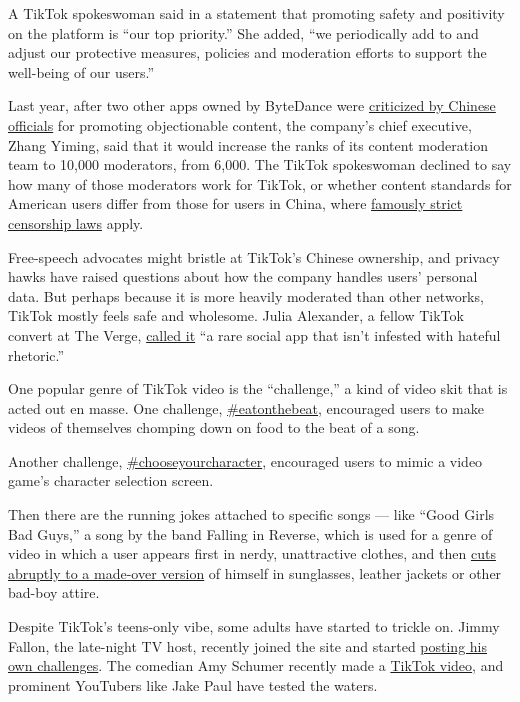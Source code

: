 A TikTok spokeswoman said in a statement that promoting safety and
positivity on the platform is ``our top priority.'' She added, ``we
periodically add to and adjust our protective measures, policies and
moderation efforts to support the well-being of our users.''

Last year, after two other apps owned by ByteDance were
\href{https://www.nytimes.com/2018/10/29/technology/bytedance-app-funding-china.html}{criticized
by Chinese officials} for promoting objectionable content, the company's
chief executive, Zhang Yiming, said that it would increase the ranks of
its content moderation team to 10,000 moderators, from 6,000. The TikTok
spokeswoman declined to say how many of those moderators work for
TikTok, or whether content standards for American users differ from
those for users in China, where
\href{https://www.nytimes.com/2018/01/02/business/china-toutiao-censorship.html}{famously
strict censorship laws} apply.

Free-speech advocates might bristle at TikTok's Chinese ownership, and
privacy hawks have raised questions about how the company handles users'
personal data. But perhaps because it is more heavily moderated than
other networks, TikTok mostly feels safe and wholesome. Julia Alexander,
a fellow TikTok convert at The Verge,
\href{https://www.theverge.com/2018/11/5/18009260/tiktok-musically-youtube-challenge-vine}{called
it} ``a rare social app that isn't infested with hateful rhetoric.''

One popular genre of TikTok video is the ``challenge,'' a kind of video
skit that is acted out en masse. One challenge,
\href{http://vm.tiktok.com/JfUMLQ/}{\#eatonthebeat}, encouraged users to
make videos of themselves chomping down on food to the beat of a song.

Another challenge,
\href{http://vm.tiktok.com/Jfp8Br/}{\#chooseyourcharacter}, encouraged
users to mimic a video game's character selection screen.

Then there are the running jokes attached to specific songs --- like
``Good Girls Bad Guys,'' a song by the band Falling in Reverse, which is
used for a genre of video in which a user appears first in nerdy,
unattractive clothes, and then \href{http://vm.tiktok.com/JfVfbM/}{cuts
abruptly to a made-over version} of himself in sunglasses, leather
jackets or other bad-boy attire.

Despite TikTok's teens-only vibe, some adults have started to trickle
on. Jimmy Fallon, the late-night TV host, recently joined the site and
started \href{https://www.youtube.com/watch?v=M_kpmrqssFE}{posting his
own challenges}. The comedian Amy Schumer recently made a
\href{https://m.tiktok.com/v/6627958333363981573.html}{TikTok video},
and prominent YouTubers like Jake Paul have tested the waters.

